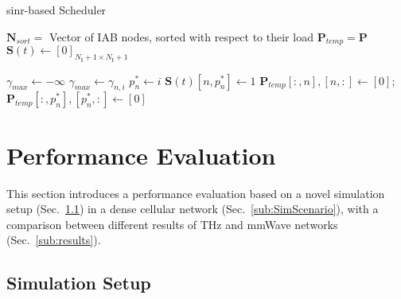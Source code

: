 \begin{algorithm}
\small
	\caption{\gls{sinr}-based Scheduler} 
	\begin{algorithmic}
        \State $\bm{N}_{sort} =$ Vector of IAB nodes, sorted with respect to their load 
        \State $\bm{P}_{temp} =  \bm{P} $
        \State $\bm{S} (t) \gets [0]_{N_{\mathrm{I}} + 1 \times N_{\mathrm{I}} + 1} $
        
            \State $\gamma_{max} \gets - \infty$
                    \State $\gamma_{max} \gets \gamma_{n, i}$
                    \State $p_n^{*} \gets i$
                \EndIf
		    \EndFor
		\State $\bm{S} (t) [n, p_n^{*}] \gets 1$
        \State $\bm{P}_{temp} [:, n], [n, :] \gets [0] $; $\bm{P}_{temp} [:, p_n^{*}], [p_n^{*}, :] \gets [0] $
	\EndFor
	\end{algorithmic} 
\label{algo:sinr}
\end{algorithm}




\section{Performance Evaluation}
\label{sec:PerfEval}
This section introduces a performance evaluation based on a novel simulation setup (Sec.~\ref{sec:SimSetup}) in a dense cellular network (Sec.~\ref{sub:SimScenario}), with a comparison between different results of THz and mmWave networks (Sec.~\ref{sub:results}).

\subsection{Simulation Setup}
\label{sec:SimSetup}

